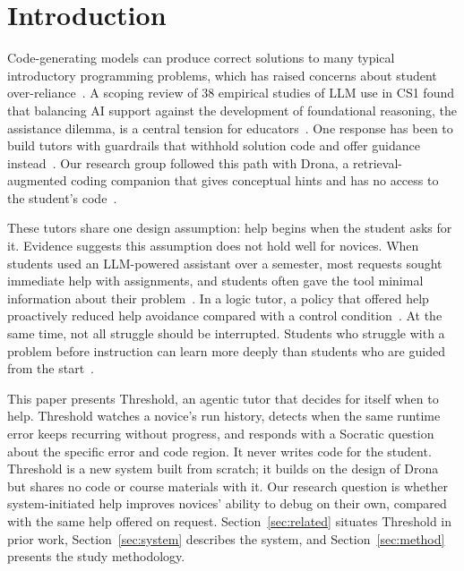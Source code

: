 \documentclass[manuscript,review]{acmart}
\begin{document}
\maketitle

\section{Introduction}
Code-generating models can produce correct solutions to many typical introductory programming problems, which has raised concerns about student over-reliance~\cite{denny2024era}. A scoping review of 38 empirical studies of LLM use in CS1 found that balancing AI support against the development of foundational reasoning, the assistance dilemma, is a central tension for educators~\cite{aruleba2025scoping}. One response has been to build tutors with guardrails that withhold solution code and offer guidance instead~\cite{liffiton2023codehelp,bassner2024iris,kazemitabaar2024codeaid}. Our research group followed this path with Drona, a retrieval-augmented coding companion that gives conceptual hints and has no access to the student's code~\cite{deoraj2025guiding}.

These tutors share one design assumption: help begins when the student asks for it. Evidence suggests this assumption does not hold well for novices. When students used an LLM-powered assistant over a semester, most requests sought immediate help with assignments, and students often gave the tool minimal information about their problem~\cite{sheese2024patterns}. In a logic tutor, a policy that offered help proactively reduced help avoidance compared with a control condition~\cite{maniktala2020helpneed}. At the same time, not all struggle should be interrupted. Students who struggle with a problem before instruction can learn more deeply than students who are guided from the start~\cite{kapur2012variance}.

This paper presents Threshold, an agentic tutor that decides for itself when to help. Threshold watches a novice's run history, detects when the same runtime error keeps recurring without progress, and responds with a Socratic question about the specific error and code region. It never writes code for the student. Threshold is a new system built from scratch; it builds on the design of Drona but shares no code or course materials with it. Our research question is whether system-initiated help improves novices' ability to debug on their own, compared with the same help offered on request. Section~\ref{sec:related} situates Threshold in prior work, Section~\ref{sec:system} describes the system, and Section~\ref{sec:method} presents the study methodology.
\end{document}
